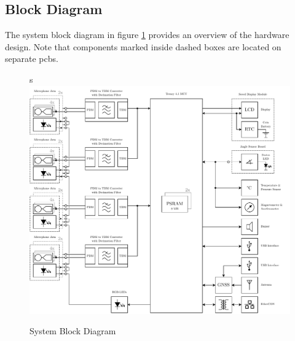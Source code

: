 \subsection{Block Diagram}
The system block diagram in figure \ref{fig:system_block_diagram} provides an overview of the hardware design.
Note that components marked inside dashed boxes are located on separate \acrshort{pcb}s.
\begin{figure}[h!]s
	\hspace{-1.3cm}
	\includegraphics[width=1.28\textwidth, angle=90]{images/6_design_final/final_design_block_diagram.pdf}
	\vspace{-0.1cm}
	\caption{System Block Diagram}
	\label{fig:system_block_diagram}
\end{figure}
\newpage

